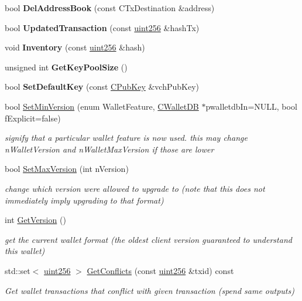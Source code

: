 \begin{DoxyCompactItemize}
\item 
bool {\bfseries Del\+Address\+Book} (const C\+Tx\+Destination \&address)
\item 
bool {\bfseries Updated\+Transaction} (const \mbox{\hyperlink{classuint256}{uint256}} \&hash\+Tx)
\item 
\mbox{\label{class_c_wallet_a1d8866fc8756a846058ea16c730b02e1}} 
void {\bfseries Inventory} (const \mbox{\hyperlink{classuint256}{uint256}} \&hash)
\item 
\mbox{\label{class_c_wallet_a9d7415d88d10655ff2188bc713dff662}} 
unsigned int {\bfseries Get\+Key\+Pool\+Size} ()
\item 
bool {\bfseries Set\+Default\+Key} (const \mbox{\hyperlink{class_c_pub_key}{C\+Pub\+Key}} \&vch\+Pub\+Key)
\item 
bool \mbox{\hyperlink{group__map_wallet_gafa48a3ee3096681650c8b9589579e9cb}{Set\+Min\+Version}} (enum Wallet\+Feature, \mbox{\hyperlink{class_c_wallet_d_b}{C\+Wallet\+DB}} $\ast$pwalletdb\+In=N\+U\+LL, bool f\+Explicit=false)
\begin{DoxyCompactList}\small\item\em signify that a particular wallet feature is now used. this may change n\+Wallet\+Version and n\+Wallet\+Max\+Version if those are lower \end{DoxyCompactList}\item 
bool \mbox{\hyperlink{group__map_wallet_ga1bb7c19e7dd483f231f8077fb7fb942b}{Set\+Max\+Version}} (int n\+Version)
\begin{DoxyCompactList}\small\item\em change which version we\textquotesingle{}re allowed to upgrade to (note that this does not immediately imply upgrading to that format) \end{DoxyCompactList}\item 
\mbox{\label{class_c_wallet_a3e37adcf1b2ad9fc02ae3e8da7c692c9}} 
int \mbox{\hyperlink{class_c_wallet_a3e37adcf1b2ad9fc02ae3e8da7c692c9}{Get\+Version}} ()
\begin{DoxyCompactList}\small\item\em get the current wallet format (the oldest client version guaranteed to understand this wallet) \end{DoxyCompactList}\item 
std\+::set$<$ \mbox{\hyperlink{classuint256}{uint256}} $>$ \mbox{\hyperlink{group__map_wallet_ga63ace949094f4f52d7ef1f9f321a24e7}{Get\+Conflicts}} (const \mbox{\hyperlink{classuint256}{uint256}} \&txid) const
\begin{DoxyCompactList}\small\item\em Get wallet transactions that conflict with given transaction (spend same outputs) \end{DoxyCompactList}\end{DoxyCompactItemize}
